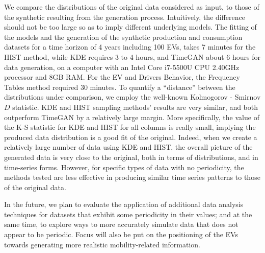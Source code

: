 \documentclass[sigconf]{acmart}
\begin{document}
We compare the distributions of the original data considered as input, to those of the synthetic resulting from the generation process. Intuitively, the difference should not be too large so as to imply different underlying models. The fitting of the models and the generation of the synthetic production and consumption datasets for a time horizon of 4 years including 100 EVs, takes 7 minutes for the HIST method, while KDE requires 3 to 4 hours, and TimeGAN about 6 hours for data generation, on a computer with an Intel Core i7-5500U CPU 2.40GHz processor and 8GB RAM. For the EV and Drivers Behavior, the Frequency Tables method required 30 minutes. To quantify a ``distance'' between the distributions under comparison, we employ the well-known Kolmogorov - Smirnov $D$ statistic.
KDE and HIST sampling %
methods' results are very similar, and both outperform TimeGAN by a relatively large margin. More specifically, 
the value of the K-S statistic for KDE and HIST for all columns is really small, implying the produced data distribution is a good fit of the original.
Indeed,  
when we create a relatively large number of %
data using KDE and HIST, the overall picture of the generated data is very close to the original, both in terms of distributions, and in time-series forms. 
However, for specific types of data %
with no periodicity, 
the methods tested are less effective in producing similar time series patterns to those of the original data.

In the future, we plan to evaluate the application of additional data analysis techniques for datasets that exhibit some periodicity in their values; and at the same time, to explore ways to more accurately simulate data that does not appear to be periodic.
Focus will also be put on the positioning of the EVs towards generating more realistic mobility-related information.
\end{document}
